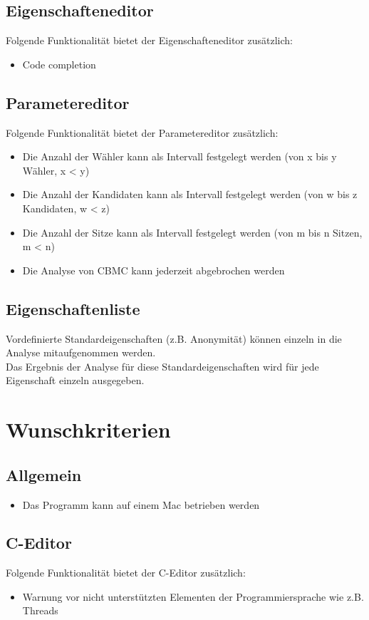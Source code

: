 \documentclass[a4paper]{scrreprt}
\begin{document}
\subsection{Eigenschafteneditor}
Folgende Funktionalität bietet der Eigenschafteneditor zusätzlich:
\begin{itemize}
	\item Code completion
\end{itemize}

\subsection{Parametereditor}
Folgende Funktionalität bietet der Parametereditor zusätzlich:
\begin{itemize}
	\item Die Anzahl der Wähler kann als Intervall festgelegt werden (von x bis y Wähler, x < y)
	\item Die Anzahl der Kandidaten kann als Intervall festgelegt werden (von w bis z Kandidaten, w < z)
	\item Die Anzahl der Sitze kann als Intervall festgelegt werden (von m bis n Sitzen, m < n)
	\item Die Analyse von \ac{CBMC} kann jederzeit abgebrochen werden
\end{itemize}

\subsection{Eigenschaftenliste}
Vordefinierte Standardeigenschaften (z.B. Anonymität) können einzeln in die Analyse mitaufgenommen werden. \\
Das Ergebnis der Analyse für diese Standardeigenschaften wird für jede Eigenschaft einzeln ausgegeben.


\section{Wunschkriterien}
\subsection{Allgemein}
\begin{itemize}
\item Das Programm kann auf einem Mac betrieben werden
\end{itemize}

\subsection{C-Editor}
Folgende Funktionalität bietet der C-Editor zusätzlich:
\begin{itemize}
	\item Warnung vor nicht unterstützten Elementen der Programmiersprache wie z.B. Threads
\end{itemize}
\end{document}
